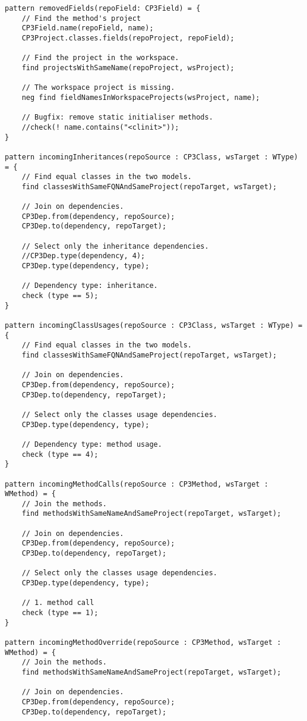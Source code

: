 \begin{lstlisting}
pattern removedFields(repoField: CP3Field) = {
	// Find the method's project
	CP3Field.name(repoField, name);
	CP3Project.classes.fields(repoProject, repoField);

	// Find the project in the workspace.
	find projectsWithSameName(repoProject, wsProject);

	// The workspace project is missing.
	neg find fieldNamesInWorkspaceProjects(wsProject, name);

	// Bugfix: remove static initialiser methods.
	//check(! name.contains("<clinit>"));
}

pattern incomingInheritances(repoSource : CP3Class, wsTarget : WType) = {
	// Find equal classes in the two models. 
	find classesWithSameFQNAndSameProject(repoTarget, wsTarget);

	// Join on dependencies.
	CP3Dep.from(dependency, repoSource);
	CP3Dep.to(dependency, repoTarget);

	// Select only the inheritance dependencies.
	//CP3Dep.type(dependency, 4);
	CP3Dep.type(dependency, type);
	
	// Dependency type: inheritance.
	check (type == 5);
}

pattern incomingClassUsages(repoSource : CP3Class, wsTarget : WType) = {
	// Find equal classes in the two models. 
	find classesWithSameFQNAndSameProject(repoTarget, wsTarget);

	// Join on dependencies.
	CP3Dep.from(dependency, repoSource);
	CP3Dep.to(dependency, repoTarget);

	// Select only the classes usage dependencies.
	CP3Dep.type(dependency, type);
	
	// Dependency type: method usage.
	check (type == 4);
}

pattern incomingMethodCalls(repoSource : CP3Method, wsTarget : WMethod) = {
	// Join the methods.
	find methodsWithSameNameAndSameProject(repoTarget, wsTarget);

	// Join on dependencies.
	CP3Dep.from(dependency, repoSource);
	CP3Dep.to(dependency, repoTarget);

	// Select only the classes usage dependencies.
	CP3Dep.type(dependency, type);
	
	// 1. method call
	check (type == 1);
}

pattern incomingMethodOverride(repoSource : CP3Method, wsTarget : WMethod) = {
	// Join the methods.
	find methodsWithSameNameAndSameProject(repoTarget, wsTarget);

	// Join on dependencies.
	CP3Dep.from(dependency, repoSource);
	CP3Dep.to(dependency, repoTarget);


\end{lstlisting}
